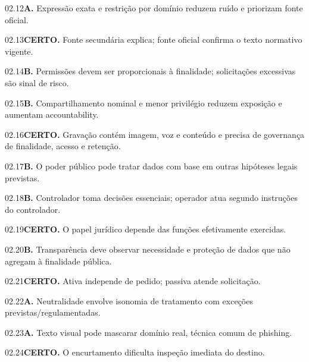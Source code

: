 \begin{solucao}{02.12}\textbf{A.} Expressão exata e restrição por domínio reduzem ruído e priorizam fonte oficial.\end{solucao}
\begin{solucao}{02.13}\textbf{CERTO.} Fonte secundária explica; fonte oficial confirma o texto normativo vigente.\end{solucao}
\begin{solucao}{02.14}\textbf{B.} Permissões devem ser proporcionais à finalidade; solicitações excessivas são sinal de risco.\end{solucao}
\begin{solucao}{02.15}\textbf{B.} Compartilhamento nominal e menor privilégio reduzem exposição e aumentam accountability.\end{solucao}
\begin{solucao}{02.16}\textbf{CERTO.} Gravação contém imagem, voz e conteúdo e precisa de governança de finalidade, acesso e retenção.\end{solucao}
\begin{solucao}{02.17}\textbf{B.} O poder público pode tratar dados com base em outras hipóteses legais previstas.\end{solucao}
\begin{solucao}{02.18}\textbf{B.} Controlador toma decisões essenciais; operador atua segundo instruções do controlador.\end{solucao}
\begin{solucao}{02.19}\textbf{CERTO.} O papel jurídico depende das funções efetivamente exercidas.\end{solucao}
\begin{solucao}{02.20}\textbf{B.} Transparência deve observar necessidade e proteção de dados que não agregam à finalidade pública.\end{solucao}
\begin{solucao}{02.21}\textbf{CERTO.} Ativa independe de pedido; passiva atende solicitação.\end{solucao}
\begin{solucao}{02.22}\textbf{A.} Neutralidade envolve isonomia de tratamento com exceções previstas/regulamentadas.\end{solucao}
\begin{solucao}{02.23}\textbf{A.} Texto visual pode mascarar domínio real, técnica comum de phishing.\end{solucao}
\begin{solucao}{02.24}\textbf{CERTO.} O encurtamento dificulta inspeção imediata do destino.\end{solucao}
